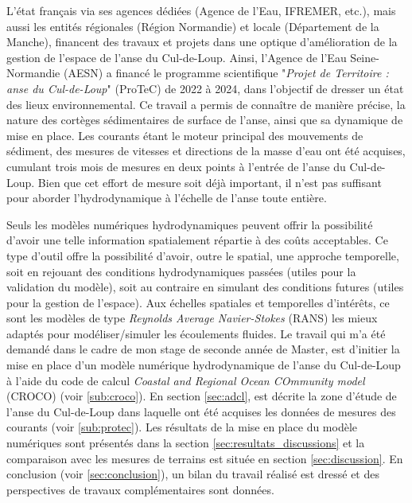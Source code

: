 \documentclass[10pt,a4paper,titlepage]{article}
\begin{document}
    L'état français via ses agences dédiées (Agence de l'Eau, IFREMER, etc.), mais aussi les entités régionales (Région Normandie) et locale (Département de la Manche), financent des travaux et projets dans une optique d'amélioration de la gestion de l'espace de l'anse du Cul-de-Loup. Ainsi, l'Agence de l'Eau Seine-Normandie (AESN) a financé le programme scientifique "\textit{Projet de Territoire : anse du Cul-de-Loup}" (ProTeC) de 2022 à 2024, dans l'objectif de dresser un état des lieux environnemental. Ce travail a permis de connaître de manière précise, la nature des cortèges sédimentaires de surface de l'anse, ainsi que sa dynamique de mise en place. Les courants étant le moteur principal des mouvements de sédiment, des mesures de vitesses et directions de la masse d'eau ont été acquises, cumulant trois mois de mesures en deux points à l'entrée de l'anse du Cul-de-Loup. Bien que cet effort de mesure soit déjà important, il n'est pas suffisant pour aborder l'hydrodynamique à l'échelle de l'anse toute entière.

    Seuls les modèles numériques hydrodynamiques peuvent offrir la possibilité d'avoir une telle information spatialement répartie à des coûts acceptables. Ce type d'outil offre la possibilité d'avoir, outre le spatial, une approche temporelle, soit en rejouant des conditions hydrodynamiques passées (utiles pour la validation du modèle), soit au contraire en simulant des conditions futures (utiles pour la gestion de l'espace). Aux échelles spatiales et temporelles d'intérêts, ce sont les modèles de type \textit{Reynolds Average Navier-Stokes} (RANS) les mieux adaptés pour modéliser/simuler les écoulements fluides.
    Le travail qui m'a été demandé dans le cadre de mon stage de seconde année de Master, est d'initier la mise en place d'un modèle numérique hydrodynamique de l'anse du Cul-de-Loup à l'aide du code de calcul \textit{Coastal and Regional Ocean COmmunity model} (CROCO) (voir \ref{sub:croco}). En section \ref{sec:adcl}, est décrite la zone d'étude de l'anse du Cul-de-Loup dans laquelle ont été acquises les données de mesures des courants (voir \ref{sub:protec}). Les résultats de la mise en place du modèle numériques sont présentés dans la section \ref{sec:resultats_discussions} et la comparaison avec les mesures de terrains est située en section \ref{sec:discussion}. En conclusion (voir \ref{sec:conclusion}), un bilan du travail réalisé est dressé et des perspectives de travaux complémentaires sont données.

    \newpage
\end{document}
